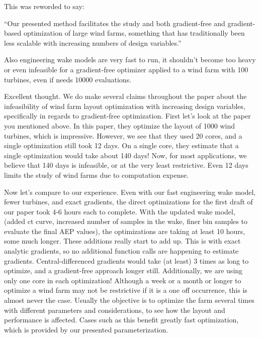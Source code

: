 \documentclass[12pt]{report}
\begin{document}
\bigskip
\color{blue}

This was reworded to say:
\smallskip

``Our presented method facilitates the study and both gradient-free and gradient-based optimization of large wind farms, something that has traditionally been less scalable with increasing numbers of design variables.''

\color{black}
\bigskip

Also engineering wake models are very fast to run, it shouldn’t become too heavy or even infeasible for a gradient-free optimizer applied to a wind farm with 100 turbines, even if needs 10000 evaluations. 

\bigskip
\color{blue}

Excellent thought. We do make several claims throughout the paper about the infeasibility of wind farm layout optimization with increasing design variables, specifically in regards to gradient-free optimization. First let's look at the paper you mentioned above. In this paper, they optimize the layout of 1000 wind turbines, which is impressive. However, we see that they used 20 cores, and a single optimization still took 12 days. On a single core, they estimate that a single optimization would take about 140 days! Now, for most applications, we believe that 140 days is infeasible, or at the very least restrictive. Even 12 days limits the study of wind farms due to computation expense.

Now let's compare to our experience. Even with our fast engineering wake model, fewer turbines, and exact gradients, the direct optimizations for the first draft of our paper took 4-6 hours each to complete. With the updated wake model, (added ct curve, increased number of samples in the wake, finer bin samples to evaluate the final AEP values), the optimizations are taking at least 10 hours, some much longer. These additions really start to add up. This is with exact analytic gradients, so no additional function calls are happening to estimate gradients. Central-differenced gradients would take (at least) 3 times as long to optimize, and a gradient-free approach longer still. Additionally, we are using only one core in each optimization! Although a week or a month or longer to optimize a wind farm may not be restrictive if it is a one off occurrence, this is almost never the case. Usually the objective is to optimize the farm several times with different parameters and considerations, to see how the layout and performance is affected. Cases such as this benefit greatly fast optimization, which is provided by our presented parameterization.
\end{document}
